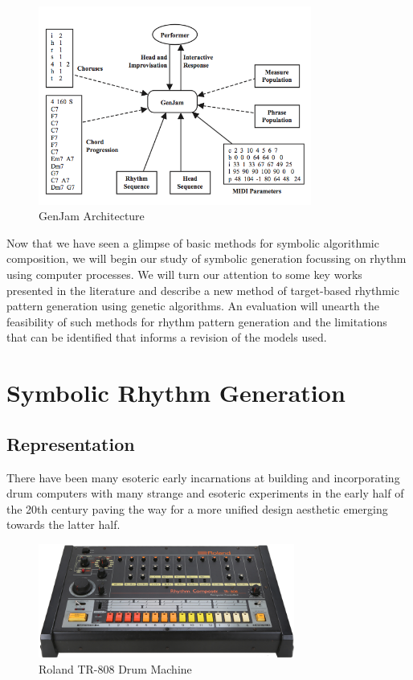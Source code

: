 \begin{figure}
	\begin{center}
		\includegraphics[width=0.8\textwidth]{ch03_symbolic/figures/genjam.png}
	\end{center}
	\caption[GenJam Architecture]{GenJam Architecture}
	\label{fig:genjam}
\end{figure}

Now that we have seen a glimpse of basic methods for symbolic algorithmic composition, we will begin our study of symbolic generation focussing on rhythm using computer processes. We will turn our attention to some key works presented in the literature and describe a new method of target-based rhythmic pattern generation using genetic algorithms. An evaluation will unearth the feasibility of such methods for rhythm pattern generation and the limitations that can be identified that informs a revision of the models used.\

\section{Symbolic Rhythm Generation}

\subsection{Representation}

There have been many esoteric early incarnations at building and incorporating drum computers with many strange and esoteric experiments in the early half of the 20th century paving the way for a more unified design aesthetic emerging towards the latter half. 

\begin{figure}
	\begin{center}
		\includegraphics[width=0.75\textwidth]{ch03_symbolic/figures/tr-808.png}
	\end{center}
	\caption[Roland TR-808 Drum Machine]{Roland TR-808 Drum Machine}
	\label{fig:tr-808}
\end{figure}


